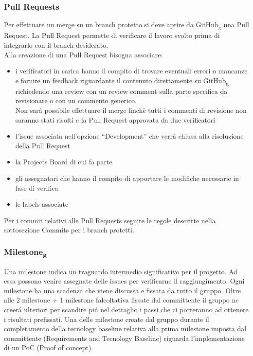 \subsubsection{Pull Requests}
Per effettuare un merge su un branch protetto si deve aprire da GitHub\textsubscript{g} una Pull Request.
La Pull Request permette di verificare il lavoro svolto prima di integrarlo con il branch desiderato.\\
Alla creazione di una Pull Request bisogna associare:
\begin{itemize}
\item i verificatori in carica hanno il compito di trovare eventuali errori o mancanze e fornire un feedback riguardante il contenuto direttamente su GitHub\textsubscript{g} richiedendo
una review con un review comment sulla parte specifica da revisionare o con un commento generico.\\
Non sarà possibile effettuare il merge finchè tutti i commenti di revisione non saranno stati risolti e la Pull Request approvata da due verificatori
\item l’issue associata nell’opzione “Development” che verrà chiusa alla risoluzione della Pull Request
\item la Projects Board di cui fa parte
\item gli assegnatari che hanno il compito di apportare le modifiche necessarie in fase di verifica
\item le labels associate
\end{itemize}
Per i commit relativi alle Pull Requests seguire le regole descritte nella sottosezione Commits per i branch protetti.

\subsubsection{Milestone\textsubscript{g}}
Una milestone indica un traguardo intermedio significativo per il progetto.
Ad essa possono venire assegnate delle issues per verificarne il raggiungimento.
Ogni milestone ha una scadenza che viene discussa e fissata da tutto il gruppo.
Oltre alle 2 milestone + 1 milestone falcoltativa fissate dal committente il gruppo ne creerá ulteriori per scandire piú nel dettaglio i passi che ci porteranno 
ad ottenere i risultati prefissati.
Una delle milestone create dal gruppo durante il completamento della tecnology baseline relativa alla prima milestone imposta dal committente (Requirements and Tecnology Baseline)
riguarda l'implementazione di un PoC (Proof of concept).


